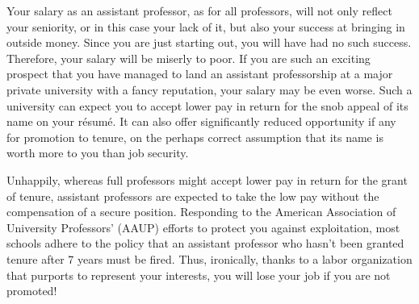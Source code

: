 \documentclass{article}
\begin{document}
\begin{enumerate}
\begin{itemize}
\begin{itemize}
			Your salary as an assistant professor, as for all professors, will not only reflect your seniority, or in this case your lack of it, but also your success at bringing in outside money. Since you are just starting out, you will have had no such success. Therefore, your salary will be miserly to poor. If you are such an exciting prospect that you have managed to land an assistant professorship at a major private university with a fancy reputation, your salary may be even worse. Such a university can expect you to accept lower pay in return for the snob appeal of its name on your r\'esum\'e. It can also offer significantly reduced opportunity if any for promotion to tenure, on the perhaps correct assumption that its name is worth more to you than job security.
			
			Unhappily, whereas full professors might accept lower pay in return for the grant of tenure, assistant professors are expected to take the low pay without the compensation of a secure position. Responding to the American Association of University Professors' (AAUP) efforts to protect you against exploitation, most schools adhere to the policy that an assistant professor who hasn't been granted tenure after 7 years must be fired. Thus, ironically, thanks to a labor organization that purports to represent your interests, you will lose your job if you are not promoted!
			

\end{itemize}
\end{itemize}
\end{enumerate}
\end{document}
